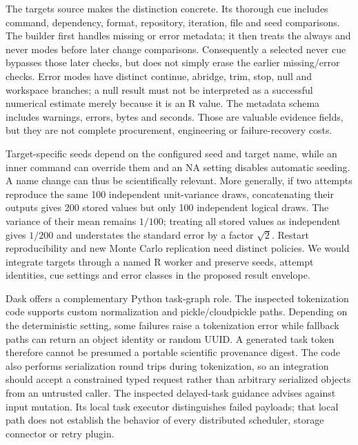 The targets source makes the distinction concrete. Its thorough cue includes command, dependency, format, repository, iteration, file and seed comparisons. The builder first handles missing or error metadata; it then treats the always and never modes before later change comparisons. Consequently a selected never cue bypasses those later checks, but does not simply erase the earlier missing/error checks. Error modes have distinct continue, abridge, trim, stop, null and workspace branches; a null result must not be interpreted as a successful numerical estimate merely because it is an R value. The metadata schema includes warnings, errors, bytes and seconds. Those are valuable evidence fields, but they are not complete procurement, engineering or failure-recovery costs.~\citep{exec25_dww_targets}

Target-specific seeds depend on the configured seed and target name, while an inner command can override them and an NA setting disables automatic seeding. A name change can thus be scientifically relevant. More generally, if two attempts reproduce the same 100 independent unit-variance draws, concatenating their outputs gives 200 stored values but only 100 independent logical draws. The variance of their mean remains $1/100$; treating all stored values as independent gives $1/200$ and understates the standard error by a factor $\sqrt{2}$. Restart reproducibility and new Monte Carlo replication need distinct policies. We would integrate targets through a named R worker and preserve seeds, attempt identities, cue settings and error classes in the proposed result envelope.~\citep{exec25_dww_targets,exec25_dww_choice}

Dask offers a complementary Python task-graph role. The inspected tokenization code supports custom normalization and pickle/cloudpickle paths. Depending on the deterministic setting, some failures raise a tokenization error while fallback paths can return an object identity or random UUID. A generated task token therefore cannot be presumed a portable scientific provenance digest. The code also performs serialization round trips during tokenization, so an integration should accept a constrained typed request rather than arbitrary serialized objects from an untrusted caller. The inspected delayed-task guidance advises against input mutation. Its local task executor distinguishes failed payloads; that local path does not establish the behavior of every distributed scheduler, storage connector or retry plugin.~\citep{exec25_dww_dask}


